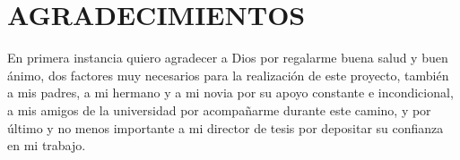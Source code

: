 \section{AGRADECIMIENTOS}

En primera instancia quiero agradecer a Dios por regalarme buena salud y buen ánimo, dos factores muy necesarios para la realización de este proyecto, también a mis padres, a mi hermano y a mi novia por su apoyo constante e incondicional, a mis amigos de la universidad por acompañarme durante este camino, y por último y no menos importante a mi director de tesis por depositar su confianza en mi trabajo.

